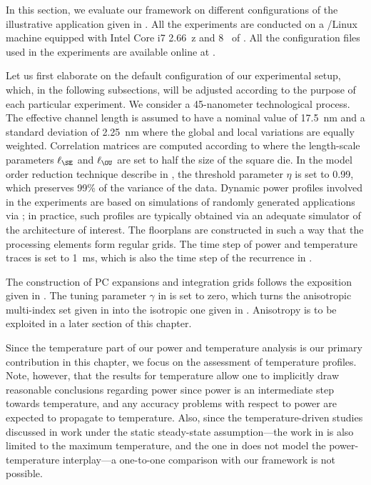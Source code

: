 In this section, we evaluate our framework on different configurations of the
illustrative application given in . All the
experiments are conducted on a /Linux machine equipped with Intel Core
i7 2.66~z and 8~ of . All the configuration files used in
the experiments are available online at \cite{eslab2014b}.

Let us first elaborate on the default configuration of our experimental setup,
which, in the following subsections, will be adjusted according to the purpose
of each particular experiment. We consider a 45-nanometer technological process.
The effective channel length is assumed to have a nominal value of 17.5~nm
\cite{ptm} and a standard deviation of 2.25~nm where the global and local
variations are equally weighted. Correlation matrices are computed according to
 where the length-scale parameters $\ell_\SE$ and
$\ell_\OU$ are set to half the size of the square die. In the model order
reduction technique describe in , the threshold
parameter $\eta$ is set to 0.99, which preserves 99\% of the variance of the
data. Dynamic power profiles involved in the experiments are based on
simulations of randomly generated applications via \cite{dick1998}; in practice,
such profiles are typically obtained via an adequate simulator of the
architecture of interest. The floorplans are constructed in such a way that the
processing elements form regular grids. The time step of power and temperature
traces is set to 1~ms, which is also the time step of the recurrence in
.

The construction of \ac{PC} expansions and integration grids follows the
exposition given in . The tuning parameter
$\gamma$ in  is set to zero, which turns the
anisotropic multi-index set given in  into
the isotropic one given in . Anisotropy is to
be exploited in a later section of this chapter.

Since the temperature part of our power and temperature analysis is our primary
contribution in this chapter, we focus on the assessment of temperature
profiles. Note, however, that the results for temperature allow one to
implicitly draw reasonable conclusions regarding power since power is an
intermediate step towards temperature, and any accuracy problems with respect to
power are expected to propagate to temperature. Also, since the
temperature-driven studies \cite{juan2011, juan2012, huang2009a, lee2013}
discussed in  work under the static steady-state
assumption---the work in \cite{juan2011} is also limited to the maximum
temperature, and the one in \cite{huang2009a} does not model the
power-temperature interplay---a one-to-one comparison with our framework is not
possible.

